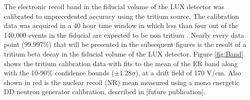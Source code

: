 The electronic recoil band in the fiducial volume of the LUX detector was calibrated to unprecedented accuracy using the tritium source. The calibration data was acquired in a 40 hour time window in which less than four out of the 140,000 events in the fiducial are expected to be non tritium \cite{LUX_BG}.  Nearly every data point (99.997\%) that will be presented in the subsequent figures is the result of a tritium beta decay in the fiducial volume of the LUX detector. Figure \ref{fig:Band} shows the tritium calibration data with fits to the mean of the ER band along with the 10-90\% confidence bounds ($\pm 1.28\sigma$), at a drift field of 170 V/cm. Also shown in red is the nuclear recoil (NR) mean measured using a mono energetic DD neutron generator calibration, described in [future publication].


\renewcommand{\baselinestretch}{1}
\small\normalsize

